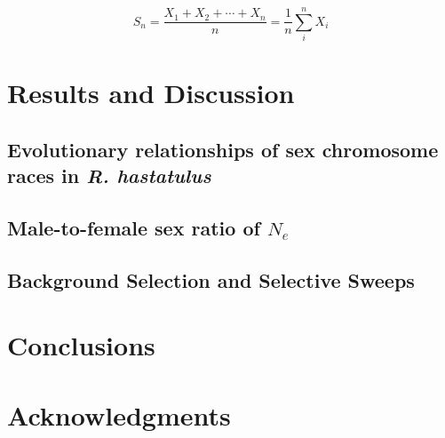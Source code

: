 \documentclass[9pt,twocolumn,twoside]{gsajnl}
\begin{document}
\begin{equation}
S_n = \frac{X_1 + X_2 + \cdots + X_n}{n}
      = \frac{1}{n}\sum_{i}^{n} X_i
\label{eq:refname1}
\end{equation}


\section*{Results and Discussion}

\subsection*{Evolutionary relationships of sex chromosome races in \textit{R. hastatulus}}

\subsection*{Male-to-female sex ratio of $N_{e}$}

\subsection*{Background Selection and Selective Sweeps}

\section*{Conclusions}
\section*{Acknowledgments}



\end{document}
